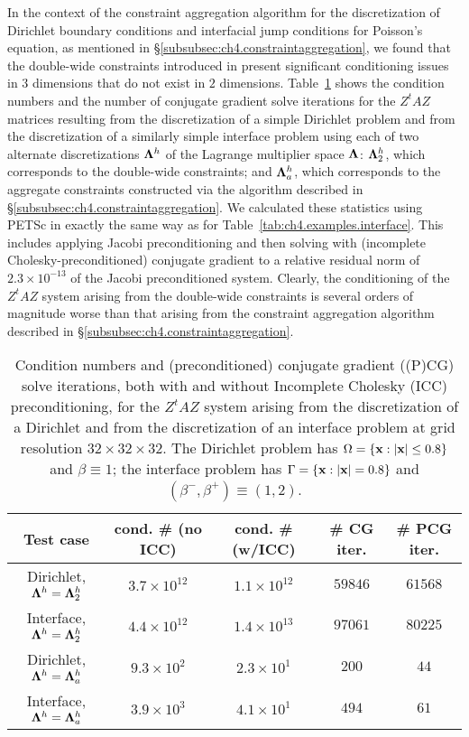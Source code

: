 In the context of the constraint aggregation algorithm for the discretization of Dirichlet boundary conditions and interfacial jump conditions for Poisson's equation, as mentioned in \S\ref{subsubsec:ch4.constraintaggregation}, we found that the double-wide constraints introduced in \cite{Bedrossian10} present significant conditioning issues in $3$ dimensions that do not exist in $2$ dimensions. Table~\ref{tab:pt2.constraintconditioning} shows the condition numbers and the number of conjugate gradient solve iterations for the $Z^tAZ$ matrices resulting from the discretization of a simple Dirichlet problem and from the discretization of a similarly simple interface problem using each of two alternate discretizations $\mathbf{\Lambda}^h$ of the Lagrange multiplier space $\mathbf{\Lambda}$: $\mathbf{\Lambda}^h_2$, which corresponds to the double-wide constraints; and $\mathbf{\Lambda}^h_a$, which corresponds to the aggregate constraints constructed via the algorithm described in \S\ref{subsubsec:ch4.constraintaggregation}. We calculated these statistics using PETSc in exactly the same way as for Table~\ref{tab:ch4.examples.interface}. This includes applying Jacobi preconditioning and then solving with (incomplete Cholesky-preconditioned) conjugate gradient to a relative residual norm of $2.3 \times 10^{-13}$ of the Jacobi preconditioned system. Clearly, the conditioning of the $Z^tAZ$ system arising from the double-wide constraints is several orders of magnitude worse than that arising from the constraint aggregation algorithm described in \S\ref{subsubsec:ch4.constraintaggregation}.

\begin{table}[htbp]
\begin{center}
\begin{tabular}{|c|c|c|c|c|}
\hline
Test case & cond. \# (no ICC) & cond. \# (w/ICC) & \# CG iter. & \# PCG iter. \\
\hline
Dirichlet, $\mathbf{\Lambda}^h = \mathbf{\Lambda}^h_2$ & $3.7 \times 10^{12}$ & $1.1 \times 10^{12}$ & $59846$ & $61568$ \\
Interface, $\mathbf{\Lambda}^h = \mathbf{\Lambda}^h_2$ & $4.4 \times 10^{12}$ & $1.4 \times 10^{13}$ & $97061$ & $80225$ \\
Dirichlet, $\mathbf{\Lambda}^h = \mathbf{\Lambda}^h_a$ & $9.3 \times 10^{ 2}$ & $2.3 \times 10^{ 1}$ &   $200$ &    $44$ \\
Interface, $\mathbf{\Lambda}^h = \mathbf{\Lambda}^h_a$ & $3.9 \times 10^{ 3}$ & $4.1 \times 10^{ 1}$ &   $494$ &    $61$ \\
\hline
\end{tabular}
\end{center}
\caption{Condition numbers and (preconditioned) conjugate gradient ((P)CG) solve iterations, both with and without Incomplete Cholesky (ICC) preconditioning, for the $Z^tAZ$ system arising from the discretization of a Dirichlet and from the discretization of an interface problem at grid resolution $32 \times 32 \times 32$. The Dirichlet problem has $\Omega = \{\mathbf{x} : \left\lvert \mathbf{x} \right\rvert \leq 0.8\}$ and $\beta \equiv 1$; the interface problem has $\Gamma = \{\mathbf{x} : \left\lvert \mathbf{x} \right\rvert = 0.8\}$ and $(\beta^-, \beta^+) \equiv (1, 2)$.}
\label{tab:pt2.constraintconditioning}
\end{table}
